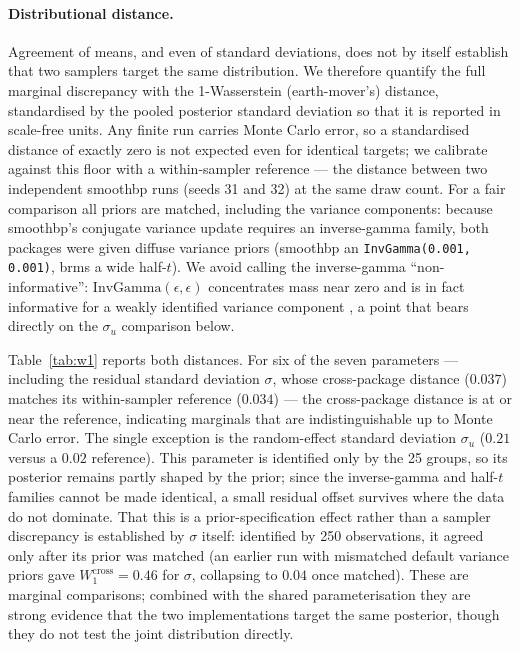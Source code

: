 \documentclass[12pt]{article}
\newcommand{\pkg}[1]{\textsf{#1}}
\newcommand{\code}[1]{\texttt{#1}}
\begin{document}
\paragraph{Distributional distance.} Agreement of means, and even of standard deviations, does not by itself establish that two samplers target the same distribution. We therefore quantify the full marginal discrepancy with the 1-Wasserstein (earth-mover's) distance, standardised by the pooled posterior standard deviation so that it is reported in scale-free units. Any finite run carries Monte Carlo error, so a standardised distance of exactly zero is not expected even for identical targets; we calibrate against this floor with a within-sampler reference --- the distance between two independent \pkg{smoothbp} runs (seeds 31 and 32) at the same draw count. For a fair comparison all priors are matched, including the variance components: because \pkg{smoothbp}'s conjugate variance update requires an inverse-gamma family, both packages were given diffuse variance priors (\pkg{smoothbp} an \code{InvGamma(0.001, 0.001)}, \pkg{brms} a wide half-$t$). We avoid calling the inverse-gamma ``non-informative'': $\mathrm{InvGamma}(\epsilon, \epsilon)$ concentrates mass near zero and is in fact informative for a weakly identified variance component \citep{gelman2006}, a point that bears directly on the $\sigma_u$ comparison below.

Table~\ref{tab:w1} reports both distances. For six of the seven parameters --- including the residual standard deviation $\sigma$, whose cross-package distance ($0.037$) matches its within-sampler reference ($0.034$) --- the cross-package distance is at or near the reference, indicating marginals that are indistinguishable up to Monte Carlo error. The single exception is the random-effect standard deviation $\sigma_u$ ($0.21$ versus a $0.02$ reference). This parameter is identified only by the 25 groups, so its posterior remains partly shaped by the prior; since the inverse-gamma and half-$t$ families cannot be made identical, a small residual offset survives where the data do not dominate. That this is a prior-specification effect rather than a sampler discrepancy is established by $\sigma$ itself: identified by 250 observations, it agreed only after its prior was matched (an earlier run with mismatched default variance priors gave $W_1^{\text{cross}} = 0.46$ for $\sigma$, collapsing to $0.04$ once matched). These are marginal comparisons; combined with the shared parameterisation they are strong evidence that the two implementations target the same posterior, though they do not test the joint distribution directly.
\end{document}

